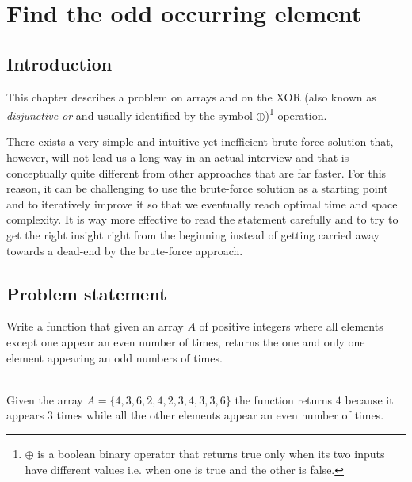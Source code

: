 %

\chapter{Find the odd occurring element}
\label{ch:find_odd_occurring_element}
\section*{Introduction}

This chapter describes a problem on arrays and on the XOR (also known as \textit{disjunctive-or} and usually identified by the symbol $\oplus$)\footnote{
	$\oplus$ is a boolean binary operator that returns true only when its two inputs have different values i.e. when one is true and the other is false.} 
operation.

There exists a very simple and intuitive yet inefficient brute-force solution that, however, will not lead us a long way in an actual interview and that is conceptually quite different from other approaches that are far faster. For this reason, it can be challenging to use the brute-force solution as a starting point and to iteratively improve it so that we eventually reach optimal time and space complexity. It is way more effective to read the statement carefully and to try to get the right insight right from the beginning instead of getting carried away towards a dead-end by the brute-force approach.

\section{Problem statement}
\begin{exercise}
Write a function that given an array $A$ of positive integers where all elements except one appear an even number of times, returns the one and only one element appearing an odd numbers of times.

	\begin{example}
		\label{ex:find_odd_occurring_element:example1}
		\hfill \\
		Given the array $A=\{4,3,6,2,4,2,3,4,3,3,6\}$ the function returns $4$ because it appears $3$ times while all the other elements appear an even number of times.
		
	\end{example}
\end{exercise}


